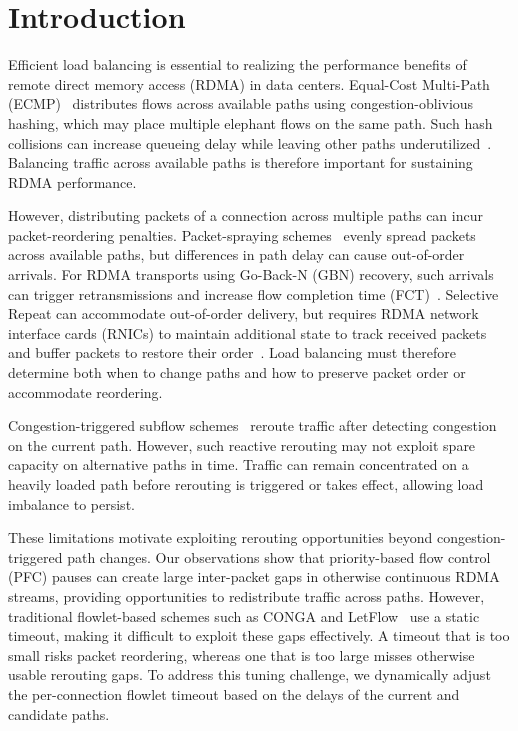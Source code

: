 \documentclass[10pt,journal,compsoc]{IEEEtran}
\begin{document}
\maketitle
\IEEEdisplaynontitleabstractindextext

\section{Introduction}
Efficient load balancing is essential to realizing the performance benefits of remote direct memory access (RDMA) in data centers. Equal-Cost Multi-Path (ECMP)~\cite{ECMP} distributes flows across available paths using congestion-oblivious hashing, which may place multiple elephant flows on the same path. Such hash collisions can increase queueing delay while leaving other paths underutilized~\cite{HPCC, Meta}. Balancing traffic across available paths is therefore important for sustaining RDMA performance.

However, distributing packets of a connection across multiple paths can incur packet-reordering penalties. Packet-spraying schemes~\cite{MPRDMA, Eunomia, PLB, Proteus} evenly spread packets across available paths, but differences in path delay can cause out-of-order arrivals. For RDMA transports using Go-Back-N (GBN) recovery, such arrivals can trigger retransmissions and increase flow completion time (FCT)~\cite{Conweave, Seqbalance}. Selective Repeat can accommodate out-of-order delivery, but requires RDMA network interface cards (RNICs) to maintain additional state to track received packets and buffer packets to restore their order~\cite{IRN, SRNIC}. Load balancing must therefore determine both when to change paths and how to preserve packet order or accommodate reordering.

Congestion-triggered subflow schemes~\cite{Conweave, Hopper, RoCELet} reroute traffic after detecting congestion on the current path. However, such reactive rerouting may not exploit spare capacity on alternative paths in time. Traffic can remain concentrated on a heavily loaded path before rerouting is triggered or takes effect, allowing load imbalance to persist.



These limitations motivate exploiting rerouting opportunities beyond congestion-triggered path changes. Our observations show that priority-based flow control (PFC) pauses can create large inter-packet gaps in otherwise continuous RDMA streams, providing opportunities to redistribute traffic across paths. However, traditional flowlet-based schemes such as CONGA and LetFlow~\cite{Conga, Letflow} use a static timeout, making it difficult to exploit these gaps effectively. A timeout that is too small risks packet reordering, whereas one that is too large misses otherwise usable rerouting gaps. To address this tuning challenge, we dynamically adjust the per-connection flowlet timeout based on the delays of the current and candidate paths.
\end{document}
